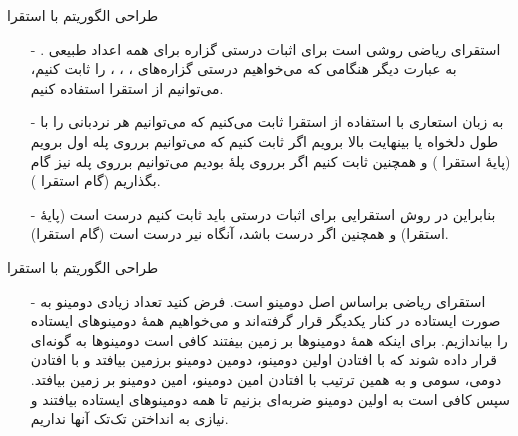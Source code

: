 
\begin{frame}{‌طراحی الگوریتم با استقرا}
\begin{itemize}\itemr
\item[-]
استقرای ریاضی
روشی است برای اثبات درستی گزاره
برای همه اعداد طبیعی
. به عبارت دیگر هنگامی که می‌خواهیم درستی گزاره‌های
،
،
\m{\cdots}
،
را ثابت کنیم، می‌توانیم از استقرا استفاده کنیم.
\item[-]
به زبان استعاری با استفاده از استقرا ثابت می‌کنیم که می‌توانیم هر نردبانی را با طول دلخواه یا بینهایت بالا برویم اگر ثابت کنیم که می‌‌توانیم برروی پله اول برویم (پایهٔ استقرا
) و همچنین ثابت کنیم اگر برروی پلهٔ
بودیم می‌توانیم برروی پله
نیز گام بگذاریم (گام استقرا
).
\item[-]
بنابراین در روش استقرایی برای اثبات درستی
باید ثابت کنیم
درست است (پایهٔ استقرا) و همچنین اگر
درست باشد، آنگاه
نیر درست است (گام استقرا).
\end{itemize}
\end{frame}


\begin{frame}{‌طراحی الگوریتم با استقرا}
\begin{itemize}\itemr
\item[-]
استقرای ریاضی براساس اصل دومینو
است. فرض کنید تعداد زیادی دومینو به صورت ایستاده در کنار یکدیگر قرار گرفته‌اند و می‌خواهیم همهٔ دومینوهای ایستاده را بیاندازیم. برای اینکه همهٔ دومینوها بر زمین بیفتند کافی است دومینوها به گونه‌ای قرار داده شوند که با افتادن اولین دومینو، دومین دومینو برزمین بیافتد و با افتادن دومی، سومی و به همین ترتیب با افتادن
امین دومینو،
امین دومینو بر زمین بیافتد. سپس کافی است به اولین دومینو ضربه‌ای بزنیم تا همه دومینوهای ایستاده بیافتند و نیازی به انداختن تک‌تک آنها نداریم.
\end{itemize}
\end{frame}

\iffalse
\begin{frame}{‌طراحی الگوریتم با استقرا}
\begin{itemize}\itemr
\item[-]
در طراحی یک مسئله به روش استقرایی، باید برای پاسخ مسئله یک رابطه پیدا کنیم و پاسخ مسئله را به روش استقرایی اثبات کنیم. و سپس می‌توانیم از رابطهٔ به دست آمده برای حل مسئله استفاده کنیم.
\item[-]
برای مثال فرض کنید می‌خواهیم جمع
\m{n}
عدد اول صحیح را به دست آوریم. برای این کار
\m{n}
عدد را با یکدیگر جمع کنیم. پس الگوریتم در واقع
\m{O(n)}
است.
\item[-]
برای حل این مسئله به روش استقرایی باید رابطه‌ای برای جواب مسئله پیدا کنیم. به عبارت دیگر آیا عبارتی وجود دارد که توسط آن بتوان جمع
\m{n}
عدد اول اعداد صحیح را به دست آورد؟
\end{itemize}
\end{frame}
\fi

